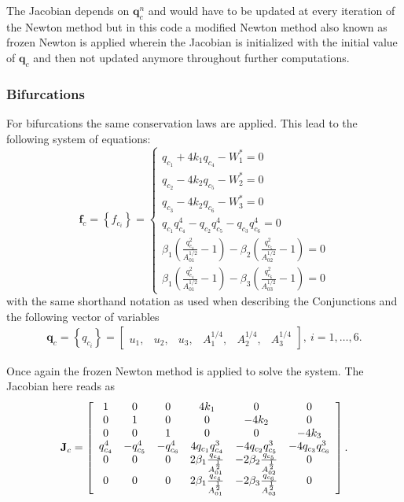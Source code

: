 \documentclass[a4paper, oneside]{discothesis}
\begin{document}
The Jacobian depends on $\mathbf{q}_c^n$ and would have to be updated at every iteration of the Newton method but in this code a modified Newton method also known as frozen Newton is applied wherein the Jacobian is initialized with the initial value of $\mathbf{q}_c$ and then not updated anymore throughout further computations.
\subsubsection{Bifurcations}
For bifurcations the same conservation laws are applied.
This lead to the following system of equations:
$$
\mathbf{f}_c=\left\{f_{c_i}\right\}=\left\{\begin{array}{l}
		q_{c_1}+4 k_1 q_{c_4}-W_1^*=0 \\
		q_{c_2}-4 k_2 q_{c_5}-W_2^*=0 \\
		q_{c_3}-4 k_2 q_{c_6}-W_3^*=0 \\
		q_{c_1} q_{c_4}^4-q_{c_2} q_{c_5}^4-q_{c_3} q_{c_6}^4=0 \\
		\beta_1\left(\frac{q_{c_4}^2}{A_{01}^{1 / 2}}-1\right)-\beta_2\left(\frac{q_{c_5}^2}{A_{02}^{1 / 2}}-1\right)=0 \\
		\beta_1\left(\frac{q_{c_4}^2}{A_{01}^{1 / 2}}-1\right)-\beta_3\left(\frac{q_{c_6}^2}{A_{03}^{1 / 2}}-1\right)=0 
\end{array}\right. \label{syseq_bif}
$$
with the same shorthand notation as used when describing the Conjunctions and the following vector of variables
$$
\begin{aligned}
 \mathbf{q}_c=\left\{q_{c_i}\right\}=\left[\begin{array}{llllll}
		u_1, & u_2, & u_3, & A_1^{1 / 4}, & A_2^{1 / 4}, & A_3^{1 / 4}
\end{array}\right], \ i=1, \ldots, 6. 
\end{aligned}
$$

Once again the frozen Newton method is applied to solve the system.
The Jacobian here reads as
$$\mathbf{J}_{c}=\left[\begin{array}{c c c c c c}
		1&0&0&4k_1&0&0\\
		0&1&0&0&-4k_2&0\\
		0&0&1&0&0&-4k_3\\
		q_{c_4}^4 & -q_{c_5}^4 & -q_{c_6}^4 & 4q_{c_1}q_{c_4}^3 & -4q_{c_2}q_{c_5}^3 & -4q_{c_3}q_{c_6}^3 \\
		0 & 0 & 0 & 2\beta_1\frac{q_{c_4}}{A_{01}^{\frac{1}{2}}} & -2\beta_2\frac{q_{c_5}}{A_{02}^{\frac{1}{2}}} & 0\\
		0 & 0 & 0 & 2\beta_1\frac{q_{c_4}}{A_{01}^{\frac{1}{2}}} & -2\beta_3\frac{q_{c_6}}{A_{03}^{\frac{1}{2}}} & 0\\
	\end{array} 
\right].
$$
\end{document}
